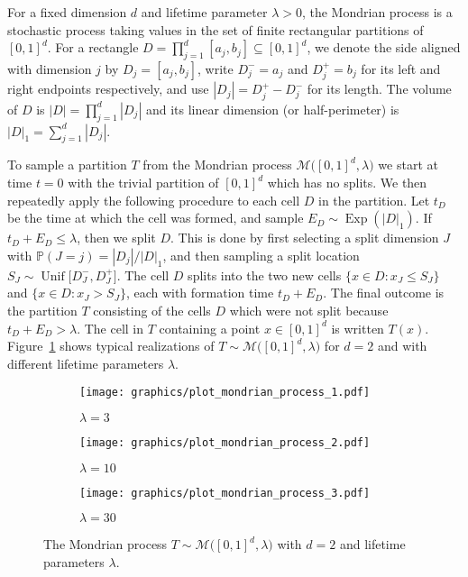 \documentclass[11pt,lof]{puthesis}
\renewcommand{\P}{\ensuremath{\mathbb{P}}}
\newcommand{\cM}{\ensuremath{\mathcal{M}}}
\DeclareMathOperator{\Unif}{Unif}
\DeclareMathOperator{\Exp}{Exp}
\theoremstyle{break}
\theoremstyle{proof}
\begin{document}
For a fixed dimension $d$ and lifetime parameter $\lambda > 0$, the Mondrian
process is a stochastic process taking values in the set of finite rectangular
partitions of $[0,1]^d$. For a rectangle
$D = \prod_{j=1}^d [a_j, b_j] \subseteq [0,1]^d$,
we denote the side aligned with dimension $j$ by $D_j = [a_j, b_j]$, write
$D_j^- = a_j$ and $D_j^+ = b_j$ for its left and right endpoints respectively,
and use $|D_j| = D_j^+ - D_j^-$ for its length. The volume of $D$ is
$|D| = \prod_{j=1}^{d} |D_j|$ and its linear dimension (or half-perimeter) is
$|D|_1 = \sum_{j=1}^{d} |D_j|$.

To sample a partition $T$ from the Mondrian process
$\cM \big( [0,1]^d, \lambda \big)$ we start at time $t=0$ with the trivial
partition of $[0,1]^d$ which has no splits. We then repeatedly apply the
following procedure to each cell $D$ in the partition. Let $t_D$ be the time at
which the cell was formed, and sample $E_D \sim \Exp \left( |D|_1 \right)$. If
$t_D + E_D \leq \lambda$, then we split $D$. This is done by first selecting a
split dimension $J$ with $\P(J=j) = |D_j| / |D|_1$, and then sampling a split
location $S_J \sim \Unif\big[D_J^-, D_J^+\big]$. The cell $D$ splits into the
two new cells $\{x \in D : x_J \leq S_J\}$ and $\{x \in D : x_J > S_J\}$, each
with formation time $t_D + E_D$. The final outcome is the partition $T$
consisting of the cells $D$ which were not split because $t_D + E_D > \lambda$.
The cell in $T$ containing a point $x \in [0,1]^d$ is written $T(x)$.
Figure~\ref{fig:mondrian_process} shows typical realizations of
$T \sim \cM\big( [0,1]^d, \lambda \big)$ for $d=2$ and with different lifetime
parameters $\lambda$.
%
\begin{figure}[t]
\centering
%
\begin{subfigure}{0.32\textwidth}
\centering
\texttt{[image: graphics/plot\_mondrian\_process\_1.pdf]}
\caption{$\lambda = 3$}
\end{subfigure}
%
\begin{subfigure}{0.32\textwidth}
\centering
\texttt{[image: graphics/plot\_mondrian\_process\_2.pdf]}
\caption{$\lambda = 10$}
\end{subfigure}
%
\begin{subfigure}{0.32\textwidth}
\centering
\texttt{[image: graphics/plot\_mondrian\_process\_3.pdf]}
\caption{$\lambda = 30$}
\end{subfigure}
%
\caption[The Mondrian process]{
The Mondrian process $T \sim \cM \big( [0,1]^d, \lambda \big)$ with
$d=2$ and lifetime parameters $\lambda$.}
\label{fig:mondrian_process}
\end{figure}
\end{document}
